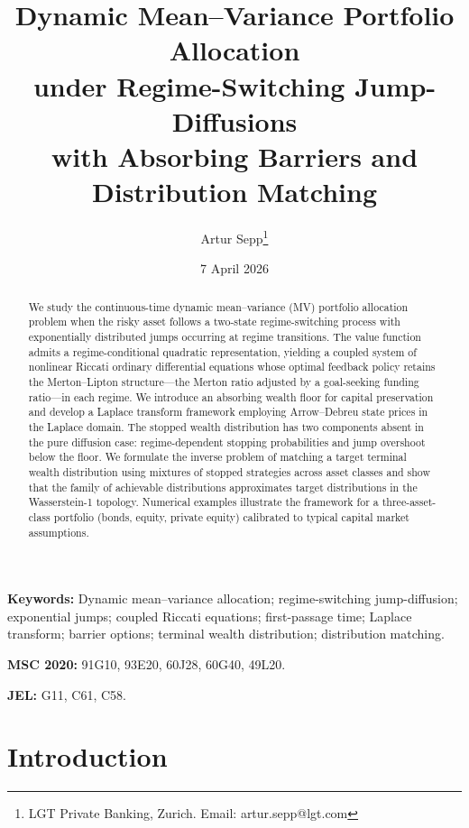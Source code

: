 \documentclass[11pt,a4paper]{article}
\title{\textbf{Dynamic Mean--Variance Portfolio Allocation \\ under Regime-Switching Jump-Diffusions \\ with Absorbing Barriers and Distribution Matching}}
\author{Artur Sepp\thanks{LGT Private Banking, Zurich. Email: artur.sepp@lgt.com}}
\date{7 April 2026}
\numberwithin{equation}{section}
\begin{document}
\maketitle

\begin{abstract}
We study the continuous-time dynamic mean--variance (MV) portfolio 
allocation problem when the risky asset follows a two-state 
regime-switching process with exponentially distributed jumps occurring 
at regime transitions. The value function admits a regime-conditional 
quadratic representation, yielding a coupled system of nonlinear Riccati 
ordinary differential equations whose optimal feedback policy retains the 
Merton--Lipton structure---the Merton ratio adjusted by a goal-seeking 
funding ratio---in each regime.
We introduce an absorbing wealth floor for capital preservation and 
develop a Laplace transform framework employing Arrow--Debreu state prices 
in the Laplace domain. The stopped wealth distribution has two components 
absent in the pure diffusion case: regime-dependent stopping probabilities 
and jump overshoot below the floor.
We formulate the inverse problem of matching a target terminal wealth 
distribution using mixtures of stopped strategies across asset classes and 
show that the family of achievable distributions approximates target distributions in the Wasserstein-1 topology. Numerical examples 
illustrate the framework for a three-asset-class portfolio (bonds, equity, 
private equity) calibrated to typical capital market assumptions.
\end{abstract}

\medskip
\noindent\textbf{Keywords:} Dynamic mean--variance allocation; regime-switching jump-diffusion; exponential jumps; coupled Riccati equations; first-passage time; Laplace transform; barrier options; terminal wealth distribution; distribution matching.

\medskip
\noindent\textbf{MSC 2020:} 91G10, 93E20, 60J28, 60G40, 49L20.

\medskip
\noindent\textbf{JEL:} G11, C61, C58.


\section{Introduction}\label{sec:intro}
\end{document}
